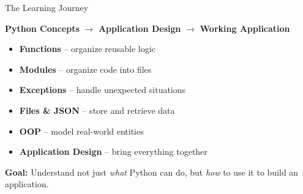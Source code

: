 \begin{frame}{The Learning Journey}

    \begin{center}
        \Large
        \textbf{Python Concepts}
        $\longrightarrow$
        \textbf{Application Design}
        $\longrightarrow$
        \textbf{Working Application}
    \end{center}

    \vspace{0.7cm}

    \begin{itemize}
        \item \textbf{Functions} -- organize reusable logic
        \item \textbf{Modules} -- organize code into files
        \item \textbf{Exceptions} -- handle unexpected situations
        \item \textbf{Files \& JSON} -- store and retrieve data
        \item \textbf{OOP} -- model real-world entities
        \item \textbf{Application Design} -- bring everything together
    \end{itemize}

    \vfill

    \begin{center}
        \textbf{Goal:} Understand not just \emph{what} Python can do,
        but \emph{how} to use it to build an application.
    \end{center}

\end{frame}